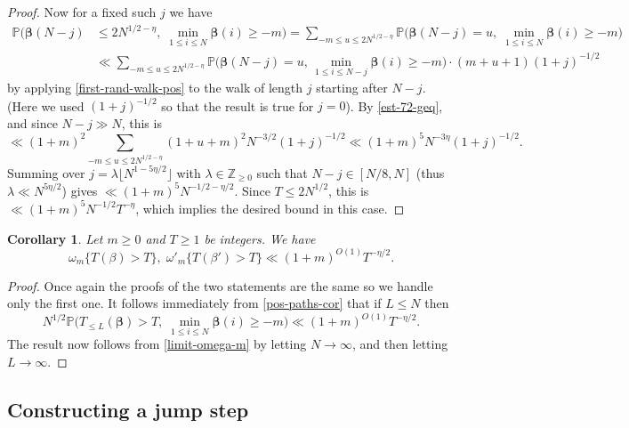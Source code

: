 \documentclass[11pt,reqno]{amsart}
\numberwithin{equation}{section}
\newtheorem{corollary}[theorem]{Corollary}
\theoremstyle{definition}
\theoremstyle{remark}
\newcommand{\mb}{\mathbb}
\def\boldbeta{\boldsymbol\beta}
\renewcommand{\le}{\leqslant}
\renewcommand{\ge}{\geqslant}
\newcommand\Z{\mathbb{Z}}
\begin{document}
\begin{proof}
Now for a fixed such $j$ we have
\begin{align*} \mb{P} \big( \boldbeta(N - j) & \le 2N^{1/2 - \eta},\; \min_{1 \le i \le N} \boldbeta(i) \ge -m\big) = \sum_{-m \le u \le 2N^{1/2 - \eta}} \mb{P} \big( \boldbeta(N - j) = u, \;\min_{1 \le i \le N} \boldbeta(i) \ge -m\big)\\
& \ll  \sum_{-m \le u \le 2N^{1/2 - \eta}} \mb{P} \big( \boldbeta(N - j) = u, \,\min_{1 \le i \le N-j} \boldbeta(i) \ge -m\big) \cdot (m + u + 1) (1 + j)^{-1/2} \end{align*}
by applying \cref{first-rand-walk-pos} to the walk of length $j$ starting after $N - j$. (Here we used $(1 + j)^{-1/2}$ so that the result is true for $j = 0$). By \cref{est-72-geq}, and since $N - j \gg N$, this is
\[ \ll (1 + m)^{2} \sum_{-m \le u \le 2N^{1/2 - \eta}} (1 + u + m)^2 N^{-3/2} (1 + j)^{-1/2} \ll (1 + m)^5 N^{ - 3\eta} (1 +  j)^{-1/2}.\]
Summing over $j = \lambda \lfloor N^{1 - 5\eta/2} \rfloor$ with $\lambda \in \Z_{\ge 0}$ such that $N - j \in [N/8, N]$ (thus $\lambda \ll N^{5\eta/2}$) gives $\ll (1 + m)^{5} N^{-1/2 - \eta/2}$. Since $T \le 2 N^{1/2}$, this is $\ll (1 + m)^{5} N^{-1/2} T^{-\eta}$, which implies the desired bound in this case.\end{proof}


\begin{corollary}\label{lem13.10} Let $m \ge 0$ and $T \ge 1$ be integers.
We have \[ \omega_m \{  T(\beta) > T \},\;  \omega'_m \{  T(\beta') > T \} \ll (1 + m)^{O(1)} T^{-\eta/2}.\]
\end{corollary}
\begin{proof} Once again the proofs of the two statements are the same so we handle only the first one.
It follows immediately from \cref{pos-paths-cor} that if $L \le N$ then
\[ N^{1/2} \mb{P} \big( T_{\le L}(\boldbeta) > T, \; \min_{1 \le i \le N} \boldbeta(i) \ge -m\big) \ll (1 + m)^{O(1)} T^{-\eta/2} .\]
The result now follows from \cref{limit-omega-m} by letting $N \rightarrow \infty$, and then letting $L \rightarrow \infty$.
\end{proof}


\subsection{Constructing a jump step}
\end{document}
